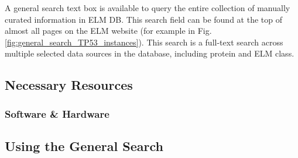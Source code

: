 \documentclass[12pt]{article}
\begin{document}
A general search text box is available to query the entire collection of
manually curated information in ELM DB. This search field can be found at the
top of almost all pages on the ELM website (for example in Fig.
\ref{fig:general_search_TP53_instances}). This search is a full-text
search across multiple selected data sources in the database, including
protein and ELM class. 

%
%
\subsection*{Necessary Resources}
\subsubsection*{Software \& Hardware}


%
%
\subsection*{Using the General Search}
\label{subsec:general_search_using}

\end{document}
